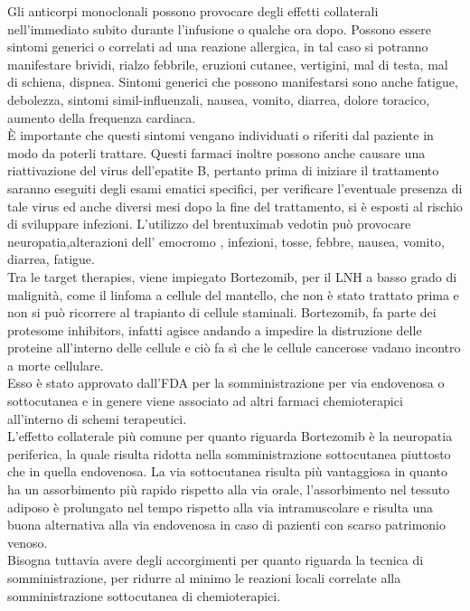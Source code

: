 Gli anticorpi monoclonali possono provocare degli effetti collaterali nell’immediato subito durante l’infusione o 
qualche ora dopo. 
Possono essere sintomi generici o correlati ad una reazione allergica, in tal caso si potranno manifestare brividi, 
rialzo febbrile, eruzioni cutanee, vertigini, mal di testa, mal di schiena, dispnea. 
Sintomi generici che possono manifestarsi sono anche  fatigue, debolezza, sintomi simil-influenzali, nausea, vomito, 
diarrea, dolore toracico, aumento della frequenza cardiaca\cite{LLSIMMUNO}.\\
È importante che questi sintomi vengano individuati o riferiti dal paziente in modo da poterli trattare.		
Questi farmaci inoltre possono anche causare una riattivazione del virus dell’epatite B, pertanto prima di iniziare 
il trattamento saranno eseguiti degli esami ematici specifici, per verificare l’eventuale presenza di tale virus ed 
anche diversi mesi dopo la fine del trattamento, si è esposti al rischio di sviluppare infezioni. 
L’utilizzo del brentuximab vedotin può provocare neuropatia,alterazioni  dell’ emocromo , infezioni, tosse, febbre, 
nausea, vomito, diarrea, fatigue\cite{IMMUNOTP}.\\

Tra le target therapies, viene impiegato Bortezomib, per il LNH a basso grado di malignità, come il linfoma a cellule del 
mantello, che non è stato trattato prima e non si può ricorrere al trapianto di cellule staminali.
Bortezomib, fa parte dei protesome inhibitors, infatti agisce andando a impedire la distruzione 
delle proteine all’interno delle cellule e ciò fa sì che le cellule cancerose vadano incontro a 
morte cellulare\cite{LYMPHOMACTION}.\\
Esso è stato approvato dall’FDA per la somministrazione per via endovenosa o sottocutanea e in genere viene associato 
ad altri farmaci chemioterapici all’interno di schemi terapeutici.\\ L’effetto collaterale più comune per quanto 
riguarda Bortezomib è la neuropatia periferica, la quale risulta ridotta nella somministrazione sottocutanea piuttosto 
che in quella endovenosa. La via sottocutanea risulta più vantaggiosa in quanto ha un assorbimento più rapido rispetto 
alla via orale, l’assorbimento nel tessuto adiposo è prolungato nel tempo rispetto alla via intramuscolare e 
risulta una buona alternativa alla via endovenosa in caso di pazienti con scarso patrimonio venoso\cite{BORTEZOMIB}.\\
Bisogna tuttavia avere degli accorgimenti per quanto riguarda la tecnica di somministrazione, per ridurre al minimo 
le reazioni locali correlate alla somministrazione sottocutanea di chemioterapici.\\

